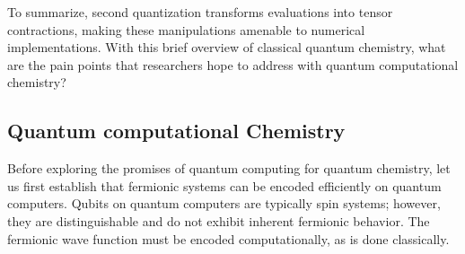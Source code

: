 \documentclass[../main.tex]{subfiles}
\begin{document}
To summarize, second quantization transforms evaluations into tensor contractions, making these manipulations amenable to numerical implementations.
With this brief overview of classical quantum chemistry, what are the pain points that researchers hope to address with quantum computational chemistry?

\subsection{Quantum computational Chemistry}

Before exploring the promises of quantum computing for quantum chemistry, let us first establish that fermionic systems can be encoded efficiently on quantum computers. Qubits on quantum computers are typically spin systems; however, they are distinguishable and do not exhibit inherent fermionic behavior. The fermionic wave function must be encoded computationally, as is done classically.
\end{document}
